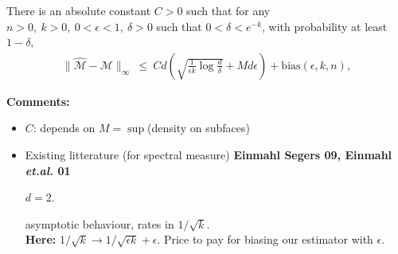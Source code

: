 \documentclass[10pt]{beamer}
\begin{document}
\begin{frame}
\begin{theorem}
There is an absolute constant $C > 0$ such that for any $n>0,~ k>0,~ 0<\epsilon<1,~ \delta>0$ such that $0<\delta<e^{-k}$, with probability at least $1 - \delta$,
\begin{align*}
\|\widehat{\mathcal{M}}- \mathcal{M}\|_\infty
~\le~  C d \left( \sqrt{ \frac{1}{\epsilon k}\log\frac{d}{\delta}} + M d\epsilon \right) + \text{bias}(\epsilon, k, n),
\end{align*}
\end{theorem}

\textbf{Comments:}
%
\begin{itemize}


\item $C$: depends on $M=\sup$(density on subfaces)


\item  Existing litterature (for spectral measure) {\footnotesize \bf Einmahl
    Segers 09, Einmahl \emph{et.al.} 01}

  \begin{center}
$d=2$.    
  \end{center}
asymptotic behaviour, rates  in $1/\sqrt k$.\\
{\bf Here:} $1/\sqrt k\to  1/\sqrt{\epsilon k} + \epsilon$. Price to pay
for biasing our estimator with $\epsilon$.
\end{itemize} 
\end{frame}
\end{document}
